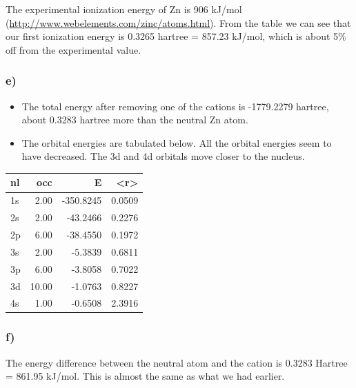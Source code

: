 \documentclass[11pt]{article}
\begin{document}
The experimental ionization energy of Zn is 906 kJ/mol (\url{http://www.webelements.com/zinc/atoms.html}). From the table we can see that our first ionization energy is 0.3265 hartree = 857.23 kJ/mol, which is about 5\% off from the experimental value. 

\subsubsection{e)}
\label{sec-2-1-5}

\begin{itemize}
\item The total energy after removing one of the cations is -1779.2279 hartree, about 0.3283 hartree more than the neutral Zn atom.

\item The orbital energies are tabulated below. All the orbital energies seem to have decreased. The 3d and 4d orbitals move closer to the nucleus.
\end{itemize}

\begin{center}
\begin{tabular}{lrrr}
nl & occ & E & <r>\\
\hline
1s & 2.00 & -350.8245 & 0.0509\\
2s & 2.00 & -43.2466 & 0.2276\\
2p & 6.00 & -38.4550 & 0.1972\\
3s & 2.00 & -5.3839 & 0.6811\\
3p & 6.00 & -3.8058 & 0.7022\\
3d & 10.00 & -1.0763 & 0.8227\\
4s & 1.00 & -0.6508 & 2.3916\\
\end{tabular}
\end{center}

\subsubsection{f)}
\label{sec-2-1-6}

The energy difference between the neutral atom and the cation is 0.3283 Hartree = 861.95 kJ/mol. This is almost the same as what we had earlier.
\end{document}
